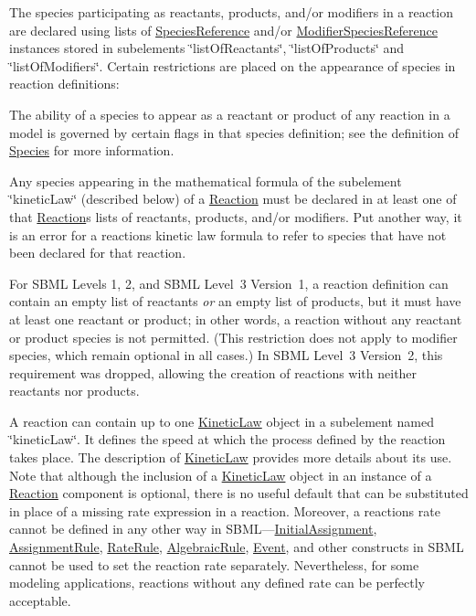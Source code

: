 The species participating as reactants, products, and/or modifiers in a reaction are declared using lists of \hyperlink{class_species_reference}{Species\+Reference} and/or \hyperlink{class_modifier_species_reference}{Modifier\+Species\+Reference} instances stored in subelements \char`\"{}list\+Of\+Reactants\char`\"{}, \char`\"{}list\+Of\+Products\char`\"{} and \char`\"{}list\+Of\+Modifiers\char`\"{}. Certain restrictions are placed on the appearance of species in reaction definitions\+: 
\begin{DoxyItemize}
\item The ability of a species to appear as a reactant or product of any reaction in a model is governed by certain flags in that species\textquotesingle{} definition; see the definition of \hyperlink{class_species}{Species} for more information.


\item Any species appearing in the mathematical formula of the subelement \char`\"{}kinetic\+Law\char`\"{} (described below) of a \hyperlink{class_reaction}{Reaction} must be declared in at least one of that \hyperlink{class_reaction}{Reaction}\textquotesingle{}s lists of reactants, products, and/or modifiers. Put another way, it is an error for a reaction\textquotesingle{}s kinetic law formula to refer to species that have not been declared for that reaction.


\item For S\+B\+ML Levels 1, 2, and S\+B\+ML Level~3 Version~1, a reaction definition can contain an empty list of reactants {\itshape or} an empty list of products, but it must have at least one reactant or product; in other words, a reaction without any reactant or product species is not permitted. (This restriction does not apply to modifier species, which remain optional in all cases.) In S\+B\+ML Level~3 Version~2, this requirement was dropped, allowing the creation of reactions with neither reactants nor products. 
\end{DoxyItemize}

A reaction can contain up to one \hyperlink{class_kinetic_law}{Kinetic\+Law} object in a subelement named \char`\"{}kinetic\+Law\char`\"{}. It defines the speed at which the process defined by the reaction takes place. The description of \hyperlink{class_kinetic_law}{Kinetic\+Law} provides more details about its use. Note that although the inclusion of a \hyperlink{class_kinetic_law}{Kinetic\+Law} object in an instance of a \hyperlink{class_reaction}{Reaction} component is optional, there is no useful default that can be substituted in place of a missing rate expression in a reaction. Moreover, a reaction\textquotesingle{}s rate cannot be defined in any other way in S\+B\+ML---\hyperlink{class_initial_assignment}{Initial\+Assignment}, \hyperlink{class_assignment_rule}{Assignment\+Rule}, \hyperlink{class_rate_rule}{Rate\+Rule}, \hyperlink{class_algebraic_rule}{Algebraic\+Rule}, \hyperlink{class_event}{Event}, and other constructs in S\+B\+ML cannot be used to set the reaction rate separately. Nevertheless, for some modeling applications, reactions without any defined rate can be perfectly acceptable.

